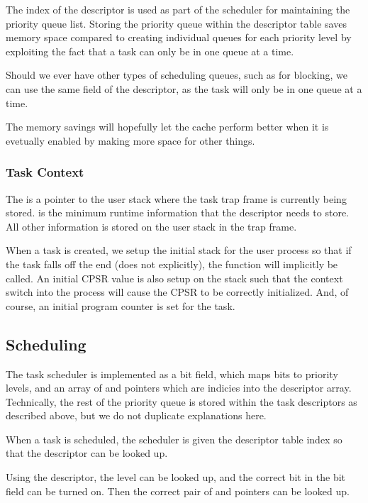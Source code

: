 \documentclass[pdftex,10pt,a4paper]{article}
\begin{document}
The  index of the descriptor is used as part of the
scheduler for maintaining the priority queue list. Storing the
priority queue within the descriptor table saves memory space
compared to creating individual queues for each priority level by
exploiting the fact that a task can only be in one queue at a time.

Should we ever have other types of scheduling queues, such as for
blocking, we can use the same  field of the descriptor, as
the task will only be in one queue at a time.

The memory savings will hopefully let the cache perform better when it
is evetually enabled by making more space for other things.

\subsubsection*{Task Context}

The  is a pointer to the user stack where the task trap frame
is currently being stored.  is the minimum runtime
information that the descriptor needs to store. All other information
is stored on the user stack in the trap frame.

When a task is created, we setup the initial stack for the user
process so that if the task falls off the end (does not 
explicitly), the  function will implicitly be called. An
initial CPSR value is also setup on the stack such that the context
switch into the process will cause the CPSR to be correctly
initialized. And, of course, an initial program counter is set for the
task.

\subsection*{Scheduling}

The task scheduler is implemented as a bit field, which maps bits to
priority levels, and an array of  and  pointers
which are indicies into the descriptor array. Technically, the rest of
the priority queue is stored within the task descriptors as described
above, but we do not duplicate explanations here.

When a task is scheduled, the scheduler is given the descriptor table
index so that the descriptor can be looked up.

Using the descriptor, the  level can be looked up, and
the correct bit in the bit field can be turned on. Then the correct
pair of  and  pointers can be looked up.
\end{document}
